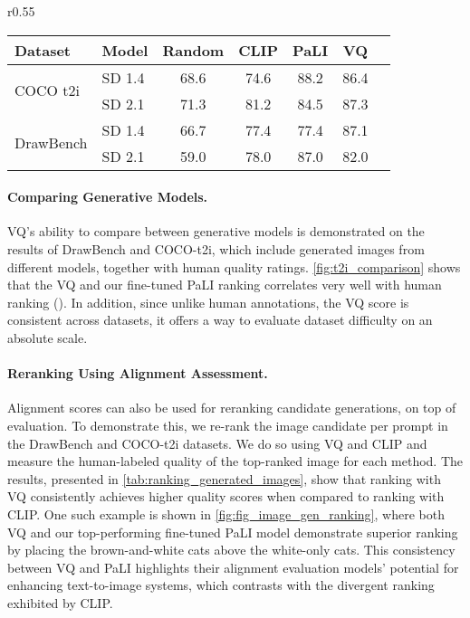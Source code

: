 \documentclass{article}
\newcommand{\VQSQR}[0]{VQ\xspace}
\begin{document}
\begin{wraptable}{r}{0.55\textwidth}
\footnotesize
\centering
\caption{Comparison of human-labeled quality scores for top-ranked images with model breakdown}
\label{tab:ranking_generated_images}
\begin{tabular}{@{}llccccc@{}}
\toprule
Dataset   & Model & Random & CLIP & PaLI & VQ \\ \midrule
\multirow{2}{*}{COCO t2i} 
                          & SD 1.4 & 68.6 & 74.6 & 88.2 & 86.4 \\
                          & SD 2.1 & 71.3 & 81.2 & 84.5 & 87.3 \\ \midrule
\multirow{2}{*}{DrawBench}  
                           & SD 1.4 & 66.7 & 77.4 & 77.4 & 87.1 \\
                           & SD 2.1 & 59.0 & 78.0 & 87.0 & 82.0 \\ \bottomrule
\end{tabular}
\end{wraptable}
 
\paragraph{Comparing Generative Models.} \VQSQR's ability to compare between generative models is demonstrated on the results of DrawBench and COCO-t2i, which include generated images from different models, together with human quality ratings.
\cref{fig:t2i_comparison} shows that the \VQSQR and our fine-tuned PaLI ranking correlates very well with human ranking (). In addition, since unlike human annotations, the \VQSQR score is consistent across datasets, it offers a way to evaluate dataset difficulty on an absolute scale. 

\paragraph{Reranking Using Alignment Assessment.} Alignment scores can also be used for reranking candidate generations, on top of evaluation. To demonstrate this, we re-rank the image candidate per prompt in the DrawBench and COCO-t2i datasets. We do so using \VQSQR and CLIP and measure the human-labeled quality of the top-ranked image for each method. The results, presented in \cref{tab:ranking_generated_images}, show that ranking with \VQSQR consistently achieves higher quality scores when compared to ranking with CLIP. One such example is shown in \cref{fig:fig_image_gen_ranking}, where both \VQSQR and our top-performing fine-tuned PaLI model demonstrate superior ranking by placing the brown-and-white cats above the white-only cats. This consistency between \VQSQR and PaLI highlights their alignment evaluation models' potential for enhancing text-to-image systems, which contrasts with the divergent ranking exhibited by CLIP.
\end{document}
